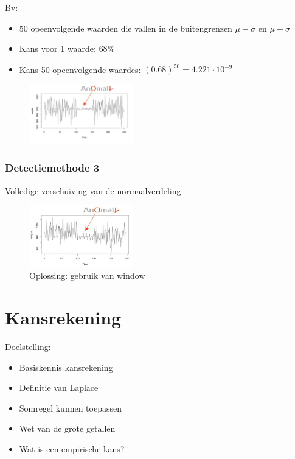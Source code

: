 \documentclass{article}
\begin{document}
Bv: 

\begin{itemize}
    \item 50 opeenvolgende waarden die vallen in de buitengrenzen $\mu - \sigma$ en $\mu + \sigma$
    \item Kans voor 1 waarde: $68\%$
    \item Kans 50 opeenvolgende waardes: $(0.68)^{50} = 4.221 \cdot 10^{-9}$
\end{itemize}

\begin{figure}[H]
    \centering
    \includegraphics[width=0.4\textwidth]{anomaly-detection3.png}
\end{figure}


\subsubsection{Detectiemethode 3}

Volledige verschuiving van de normaalverdeling


\begin{figure}[H]
    \centering
    \includegraphics[width=0.4\textwidth]{anomaly-detection4.png}
    \caption{Oplossing: gebruik van window}
\end{figure}

\section{Kansrekening}

Doelstelling: 

\begin{itemize}
    \item Basiskennis kansrekening
    \item Definitie van Laplace
    \item Somregel kunnen toepassen
    \item Wet van de grote getallen
    \item Wat is een empirische kans?
\end{itemize}
\end{document}
